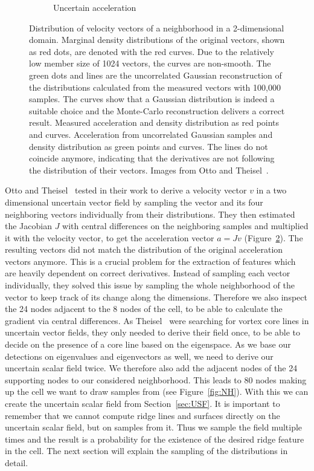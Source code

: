 \begin{figure}[t]
\begin{subfigure}{0.49\textwidth}
        \caption{Uncertain acceleration}
        \label{fig:uncacc}
    \end{subfigure}
    \caption{ Distribution of velocity vectors of a
    neighborhood in a 2-dimensional domain. Marginal density
    distributions of the original vectors, shown as red dots, are
    denoted with the red curves. Due to the relatively low member size
    of 1024 vectors, the curves are non-smooth. The green dots and lines
    are the uncorrelated Gaussian reconstruction of the distributions
    calculated from the measured vectors with 100,000 samples. The
    curves show that a Gaussian distribution is indeed a suitable
    choice and the Monte-Carlo reconstruction delivers a correct result.
     Measured acceleration and density distribution
    as red points and curves. Acceleration from uncorrelated Gaussian
    samples and density distribution as green points and curves. The lines
    do not coincide anymore, indicating that the derivatives are not
    following the distribution of their vectors. Images from Otto and
    Theisel~\cite{Vortex}.}
    \label{fig:Theisel}
\end{figure}
\indent Otto and Theisel~\cite{Vortex} tested in their work to derive a
velocity vector $v$ in a two dimensional uncertain vector field by
sampling the vector and its four neighboring vectors individually from
their distributions. They then estimated the Jacobian $J$ with central
differences on the neighboring samples and multiplied it with the
velocity vector, to get the acceleration vector $a = J v$
(Figure~\ref{fig:Theisel}). The resulting vectors did not match the
distribution of the original acceleration vectors anymore. This is a
crucial problem for the extraction of features which are heavily
dependent on correct derivatives. Instead of sampling each vector
individually, they solved this issue by sampling the whole neighborhood
of the vector to keep track of its change along the dimensions.
Therefore we also inspect the 24 nodes adjacent to the 8 nodes of the
cell, to be able to calculate the gradient via central differences. As
Theisel \etal\ were searching for vortex core lines in uncertain vector
fields, they only needed to derive their field once, to be able to
decide on the presence of a core line based on the eigenspace. As we
base our detections on eigenvalues and eigenvectors as well, we need to
derive our uncertain scalar field twice. We therefore also add the
adjacent nodes of the 24 supporting nodes to our considered
neighborhood. This leads to 80 nodes making up the cell we want to draw
samples from (see Figure~\ref{fig:NH}). With this we can create the
uncertain scalar field from Section~\ref{sec:USF}. It is important to
remember that we cannot compute ridge lines and surfaces directly on the
uncertain scalar field, but on samples from it. Thus we sample the field
multiple times and the result is a probability for the existence of the
desired ridge feature in the cell. The next section will explain the
sampling of the distributions in detail.


